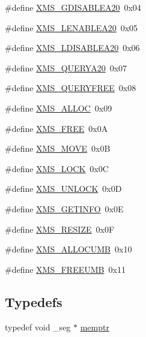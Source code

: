 \begin{DoxyCompactItemize}
\item 
\#define \hyperlink{ID__MM_8H_aa99076de3374eee979ad5b116d25a009}{XMS\_\-GDISABLEA20}~0x04
\item 
\#define \hyperlink{ID__MM_8H_af409eb996d0191d1fbfd246d310424d5}{XMS\_\-LENABLEA20}~0x05
\item 
\#define \hyperlink{ID__MM_8H_aa25fe8f9e8c6257cd6c13bd1c549c389}{XMS\_\-LDISABLEA20}~0x06
\item 
\#define \hyperlink{ID__MM_8H_a00db04c0ef3d8b55fd4ccaf3f797448d}{XMS\_\-QUERYA20}~0x07
\item 
\#define \hyperlink{ID__MM_8H_ac1bc612b4603f6bdd25d762fc6eb1aed}{XMS\_\-QUERYFREE}~0x08
\item 
\#define \hyperlink{ID__MM_8H_a74a33d30a05722ebbe85c30630d507a8}{XMS\_\-ALLOC}~0x09
\item 
\#define \hyperlink{ID__MM_8H_a8359244106f8bfed7f4a74b6d9766534}{XMS\_\-FREE}~0x0A
\item 
\#define \hyperlink{ID__MM_8H_ad8e0e5dae27baaec7b15b040b8e1307b}{XMS\_\-MOVE}~0x0B
\item 
\#define \hyperlink{ID__MM_8H_aace722673bd77fc8b565cacf248a6a42}{XMS\_\-LOCK}~0x0C
\item 
\#define \hyperlink{ID__MM_8H_ad230314d8e4297b85e02c57f6df0511d}{XMS\_\-UNLOCK}~0x0D
\item 
\#define \hyperlink{ID__MM_8H_a75b56872c25a00c5d3e2231d41a99cbc}{XMS\_\-GETINFO}~0x0E
\item 
\#define \hyperlink{ID__MM_8H_aafba0a32b088f3f01e7ee16fea40e616}{XMS\_\-RESIZE}~0x0F
\item 
\#define \hyperlink{ID__MM_8H_a75e8c70bb6890c22b9d3a5dd23012ec2}{XMS\_\-ALLOCUMB}~0x10
\item 
\#define \hyperlink{ID__MM_8H_ae44740645afb196e0b7bcc6a7b9e3410}{XMS\_\-FREEUMB}~0x11
\end{DoxyCompactItemize}
\subsection*{Typedefs}
\begin{DoxyCompactItemize}
\item 
typedef void \_\-seg $\ast$ \hyperlink{ID__MM_8H_a04062decc7eb282b066c65e9137bb9bf}{memptr}
\end{DoxyCompactItemize}
